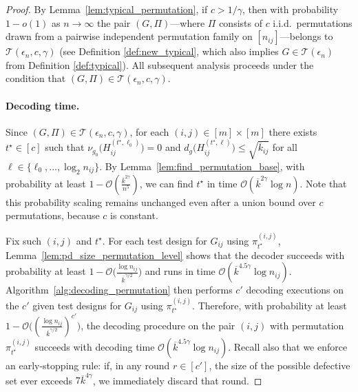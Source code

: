 \documentclass[journal]{IEEEtran}
\theoremstyle{definition}
\theoremstyle{definition}
\newcommand{\Tc}{\mathcal{T}}
\newcommand{\PV}{\nu}
\newcommand{\kb}{\overline{k}}
\newcommand{\bigO}{\mathcal{O}}
\begin{document}
\begin{proof}
By Lemma~\ref{lem:typical_permutation}, if \(c>1/\gamma\), then with probability \(1-o(1)\) as \(n\to\infty\) the pair \((G,\Pi)\)—where \(\Pi\) consists of \(c\) i.i.d.\ permutations drawn from a pairwise independent permutation family on \([n_{ij}]\)—belongs to \(\mathcal{T}(\epsilon_n,c,\gamma)\) (see Definition \ref{def:new_typical}, which also implies $G \in \mathcal{T}(\epsilon_n)$ from Definition \ref{def:typical}).
All subsequent analysis proceeds under the condition that \((G,\Pi) \in \Tc(\epsilon_n,c,\gamma)\).

\paragraph{Decoding time.}
Since \((G,\Pi) \in \Tc(\epsilon_n,c,\gamma)\), for each \((i,j) \in [m]\times[m]\) there exists \(t^{\star}\in[c]\) such that \(\PV_{g_0} \big(H^{(t^{\star},\ell_0)}_{ij}\big)=0\) and \(d_{g} \big(H^{(t^{\star},\ell)}_{ij}\big)\le \sqrt{\kb_{ij}}\) for all $\ell \in \{\ell_0,\dots,\log_2 n_{ij} \}$.
By Lemma~\ref{lem:find_permutation_base}, with probability at least \(1 - \bigO \left(\frac{\kb^{2\gamma}}{n^{5}}\right)\), we can find \(t^{\star}\) in time \(\bigO(\kb^{2\gamma} \log n)\).  Note that this probability scaling remains unchanged even after a union bound over $c$ permutations, because $c$ is constant.

Fix such \((i,j)\) and \(t^{\star}\).
For each test design for \(G_{ij}\) using \(\pi_{t^{\star}}^{(i,j)}\), Lemma~\ref{lem:pd_size_permutation_level} shows that the decoder succeeds with probability at least \(1 - \bigO \big( \tfrac{\log n_{ij}}{\kb^{\gamma/2}}\big)\) and runs in time \(\bigO(\kb^{4.5\gamma}\log n_{ij})\).
Algorithm~\ref{alg:decoding_permutation} then performs \(c'\) decoding executions on the \(c'\) given test designs for \(G_{ij}\) using \(\pi_{t^{\star}}^{(i,j)}\).
Therefore, with probability at least \(1-\bigO \bigl((\tfrac{\log n_{ij}}{\kb^{\gamma/2}})^{c'}\bigr)\), the decoding procedure on the pair \((i,j)\) with permutation \(\pi_{t^{\star}}^{(i,j)}\) succeeds with decoding time \(\bigO(\kb^{4.5\gamma}\log n_{ij})\). Recall also that we enforce an early-stopping rule: if, in any round \(r \in [c']\), the size of the possible defective set ever exceeds \(7\kb^{4\gamma}\), we immediately discard that round.



\end{proof}
\end{document}
